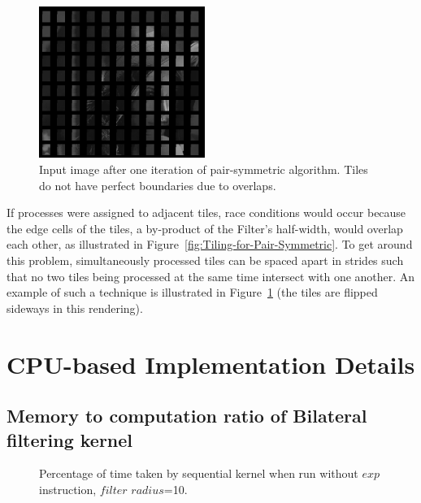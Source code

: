 \documentclass{IEEEtran}
\begin{document}
\begin{figure}
\includegraphics[width=0.48\textwidth]{images/lenatiles}
\caption{Input image after one iteration of pair-symmetric algorithm. Tiles do not have perfect boundaries due to overlaps.}
\label{fig:An-iteration-of}
\end{figure}

If processes were assigned to adjacent tiles, race conditions would occur because the edge cells of the tiles, a by-product of the Filter's half-width, would overlap each other, as illustrated in Figure~\ref{fig:Tiling-for-Pair-Symmetric}. To get around this problem, simultaneously processed tiles can be spaced apart in strides such that no two tiles being processed at the same time intersect with one another. An example of such a technique is illustrated in Figure~\ref{fig:An-iteration-of} (the tiles are flipped sideways in this rendering). 

\section{CPU-based Implementation Details}
\label{sec:optimizations} 

\subsection{Memory to computation ratio of Bilateral filtering kernel}
\begin{figure}[h!]
\begin{centering}
\par\end{centering}
\caption{Percentage of time taken by sequential kernel when run without $exp$ instruction, $filter$ $radius$=10.}
\label{fig:noexp} 
\end{figure}
\end{document}
